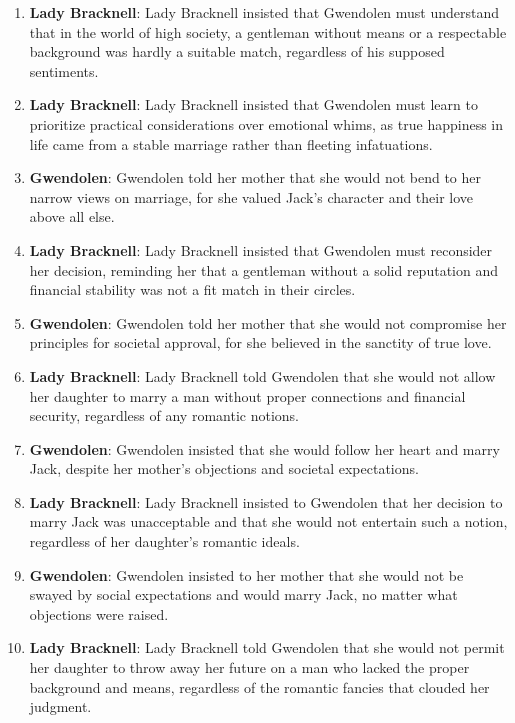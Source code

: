 \documentclass[10pt]{article}
\begin{document}
\begin{enumerate}
\item \textbf{Lady Bracknell}: Lady Bracknell insisted that Gwendolen must understand that in the world of high society, a gentleman without means or a respectable background was hardly a suitable match, regardless of his supposed sentiments.

\item \textbf{Lady Bracknell}: Lady Bracknell insisted that Gwendolen must learn to prioritize practical considerations over emotional whims, as true happiness in life came from a stable marriage rather than fleeting infatuations.

\item \textbf{Gwendolen}: Gwendolen told her mother that she would not bend to her narrow views on marriage, for she valued Jack's character and their love above all else.

\item \textbf{Lady Bracknell}: Lady Bracknell insisted that Gwendolen must reconsider her decision, reminding her that a gentleman without a solid reputation and financial stability was not a fit match in their circles.

\item \textbf{Gwendolen}: Gwendolen told her mother that she would not compromise her principles for societal approval, for she believed in the sanctity of true love.

\item \textbf{Lady Bracknell}: Lady Bracknell told Gwendolen that she would not allow her daughter to marry a man without proper connections and financial security, regardless of any romantic notions.

\item \textbf{Gwendolen}: Gwendolen insisted that she would follow her heart and marry Jack, despite her mother's objections and societal expectations.

\item \textbf{Lady Bracknell}: Lady Bracknell insisted to Gwendolen that her decision to marry Jack was unacceptable and that she would not entertain such a notion, regardless of her daughter's romantic ideals.

\item \textbf{Gwendolen}: Gwendolen insisted to her mother that she would not be swayed by social expectations and would marry Jack, no matter what objections were raised.

\item \textbf{Lady Bracknell}: Lady Bracknell told Gwendolen that she would not permit her daughter to throw away her future on a man who lacked the proper background and means, regardless of the romantic fancies that clouded her judgment.

\end{enumerate}
\end{document}
